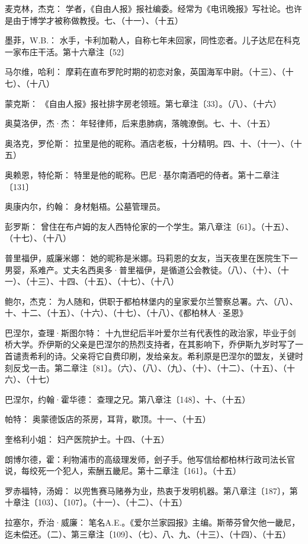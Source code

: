 \par 麦克林，杰克： 学者，《自由人报》报社编委。经常为《电讯晚报》写社论。也许是由于博学才被称做教授。七、（十一）、（十五）
\par 墨菲，W.B.： 水手，卡利加勒人，自称七年未回家，同性恋者。儿子达尼在科克一家布庄干活。第十六章注〔52〕
\par 马尔维，哈利： 摩莉在直布罗陀时期的初恋对象，英国海军中尉。（十三）、（十七）、（十八）
\par 蒙克斯： 《自由人报》报社排字房老领班。第七章注〔33〕。（八）、（十六）
\par 奥莫洛伊，杰·杰： 年轻律师，后来患肺病，落魄潦倒。七、十、（十五）
\par 奥洛克，罗伦斯： 拉里是他的昵称。酒店老板，十分精明。四、十、（十一）、（十五）
\par 奥赖恩，特伦斯： 特里是他的昵称。巴尼·基尔南酒吧的侍者。第十二章注〔131〕
\par 奥康内尔，约翰： 身材魁梧。公墓管理员。
\par 彭罗斯： 曾住在布卢姆的友人西特伦家的一个学生。第八章注〔61〕。（十五）、（十七）、（十八）
\par 普里福伊，威廉米娜： 她的昵称是米娜。玛莉恩的女友，当天夜里在医院生下一男婴，系难产。丈夫名西奥多·普里福伊，是循道公会教徒。（八）、（十）、（十一）、（十三）、十四、（十五）、（十七）、（十八）
\par 鲍尔，杰克： 为人随和，供职于都柏林堡内的皇家爱尔兰警察总署。六、（八）、十、十二、（十五）、（十六）、（十七）、（十八）、《都柏林人·圣恩》
\par 巴涅尔，查理·斯图尔特： 十九世纪后半叶爱尔兰有代表性的政治家，毕业于剑桥大学。乔伊斯的父亲是巴涅尔的热烈支持者，在其影响下，乔伊斯九岁时写了一首谴责希利的诗。父亲将它自费印刷，发给亲友。希利原是巴涅尔的盟友，关键时刻反戈一击。第二章注〔81〕。（六）、（八）、（九）、（十）、（十二）、（十五）、（十六）、（十七）
\par 巴涅尔，约翰·霍华德： 查理之兄。第八章注〔148〕、十、（十五）
\par 帕特： 奥蒙德饭店的茶房，耳背，歇顶。十一、（十五）
\par 奎格利小姐： 妇产医院护士。十四、（十五）
\par 朗博尔德，霍：利物浦市的高级理发师，刽子手。他写信给都柏林行政司法长官说，每绞死一个犯人，索酬五畿尼。第十二章注〔161〕。（十五）
\par 罗赤福特，汤姆： 以兜售赛马赌券为业，热衷于发明机器。第八章注〔187〕，第十章注〔103〕、〔107〕。（十一）、（十二）、（十五）
\par 拉塞尔，乔治·威廉： 笔名A.E.。《爱尔兰家园报》主编。斯蒂芬曾欠他一畿尼，迄未偿还。（二）、第三章注〔109〕、（七）、八、九、（十三）、（十四）、（十五）
